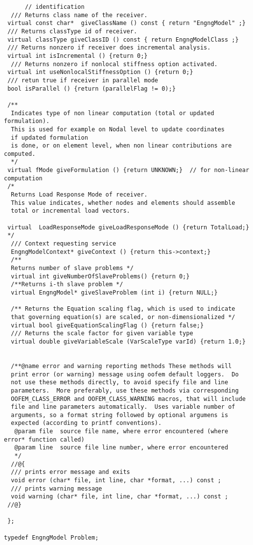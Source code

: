 \documentclass[12pt,draft]{article}
\begin{document}
{\begin{verbatim}
      // identification 
  /// Returns class name of the receiver.
 virtual const char*  giveClassName () const { return "EngngModel" ;}
 /// Returns classType id of receiver.
 virtual classType giveClassID () const { return EngngModelClass ;}
 /// Returns nonzero if receiver does incremental analysis.
 virtual int isIncremental () {return 0;}
  /// Returns nonzero if nonlocal stiffness option activated.
 virtual int useNonlocalStiffnessOption () {return 0;}
 /// retun true if receiver in parallel mode
 bool isParallel () {return (parallelFlag != 0);}

 /**
  Indicates type of non linear computation (total or updated formulation).
  This is used for example on Nodal level to update coordinates 
  if updated formulation 
  is done, or on element level, when non linear contributions are computed.
  */
 virtual fMode giveFormulation () {return UNKNOWN;}  // for non-linear computation
 /*
  Returns Load Response Mode of receiver.
  This value indicates, whether nodes and elements should assemble
  total or incremental load vectors.
  
 virtual  LoadResponseMode giveLoadResponseMode () {return TotalLoad;}
 */
  /// Context requesting service
  EngngModelContext* giveContext () {return this->context;}
  /**
  Returns number of slave problems */
  virtual int giveNumberOfSlaveProblems() {return 0;}
  /**Returns i-th slave problem */
  virtual EngngModel* giveSlaveProblem (int i) {return NULL;}

  /** Returns the Equation scaling flag, which is used to indicate
  that governing equation(s) are scaled, or non-dimensionalized */
  virtual bool giveEquationScalingFlag () {return false;}
  /// Returns the scale factor for given variable type
  virtual double giveVariableScale (VarScaleType varId) {return 1.0;}


  /**@name error and warning reporting methods These methods will
  print error (or warning) message using oofem default loggers.  Do
  not use these methods directly, to avoid specify file and line
  parameters.  More preferably, use these methods via corresponding
  OOFEM_CLASS_ERROR and OOFEM_CLASS_WARNING macros, that will include
  file and line parameters automatically.  Uses variable number of
  arguments, so a format string followed by optional argumens is
  expected (according to printf conventions).
   @param file  source file name, where error encountered (where error* function called)
   @param line  source file line number, where error encountered
   */
  //@{
  /// prints error message and exits
  void error (char* file, int line, char *format, ...) const ;
  /// prints warning message
  void warning (char* file, int line, char *format, ...) const ;
 //@}

 };

typedef EngngModel Problem;



\end{verbatim}}
\end{document}
